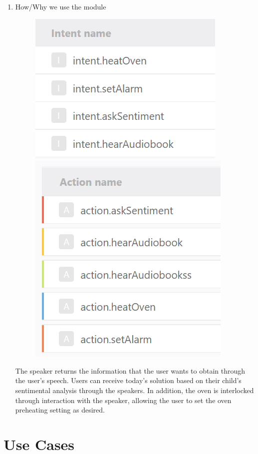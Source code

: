 \documentclass[conference]{IEEEtran}
\begin{document}
\begin{enumerate}
\begin{enumerate}
            \item How/Why we use the module
            \begin{figure}[H]
            \centering
            \includegraphics[scale=0.5]{new_assets/nugu_intent.png}
            \includegraphics[scale=0.5]{new_assets/nugu_action.png}
            \end{figure}
            The speaker returns the information that the user wants to obtain through the user's speech. Users can receive today's solution based on their child's sentimental analysis through the speakers. In addition, the oven is interlocked through interaction with the speaker, allowing the user to set the oven preheating setting as desired.
            
        \end{enumerate}
\end{enumerate}
\newpage
\section{\large{Use Cases}}
\end{document}
